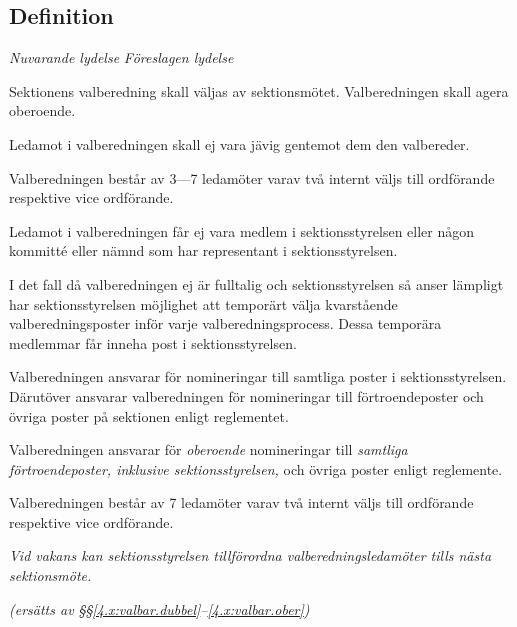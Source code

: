 \documentclass{article}
\newenvironment{lydelse}
    {\begin{paracol}{2}%
        \emph{Nuvarande lydelse}%
        \switchcolumn%
        \emph{Föreslagen lydelse}%
    \end{paracol}%
    \begin{enumerate}[label=\thesubsection.\arabic*]%
    \begin{paracol}{2}%
    }{\end{paracol}\end{enumerate}}
\begin{document}
\subsection{Definition}
\begin{lydelse}
  \setcounter{section}{6}
  \setcounter{subsection}{1}
  \item Sektionens valberedning skall väljas av sektionsmötet. Valberedningen skall agera oberoende.
  \item Ledamot i valberedningen skall ej vara jävig gentemot dem den valbereder.
  \setcounter{subsection}{2}
  \setcounter{enumi}{0}
  \item Valberedningen består av 3---7 ledamöter varav två internt väljs till ordförande respektive vice ordförande.
  \item Ledamot i valberedningen får ej vara medlem i sektionsstyrelsen eller någon kommitté eller nämnd som har representant i sektionsstyrelsen.
  \item I det fall då valberedningen ej är fulltalig och sektionsstyrelsen så anser lämpligt har sektionsstyrelsen möjlighet att temporärt välja kvarstående valberedningsposter inför varje valberedningsprocess. Dessa temporära medlemmar får inneha post i sektionsstyrelsen.
  \setcounter{subsection}{4}
  \setcounter{enumi}{0}  
  \item Valberedningen ansvarar för nomineringar till samtliga poster i sektionsstyrelsen. Därutöver ansvarar valberedningen för nomineringar till förtroendeposter och övriga poster på sektionen enligt reglementet.

  \switchcolumn
  \item Valberedningen ansvarar för \emph{oberoende} nomineringar till \emph{samtliga förtroendeposter, inklusive sektionsstyrelsen,} och övriga poster enligt reglemente. \label{13.x:valBfp}
  \item Valberedningen består av 7 ledamöter varav två internt väljs till ordförande respektive vice ordförande.
  \item \emph{Vid vakans kan sektionsstyrelsen tillförordna valberedningsledamöter tills nästa sektionsmöte. }

  \item[] \emph{(ersätts av \S\S\ref{4.x:valbar.dubbel}--\ref{4.x:valbar.ober})}
\end{lydelse}
\setcounter{section}{13}
\setcounter{subsection}{1}
\end{document}

